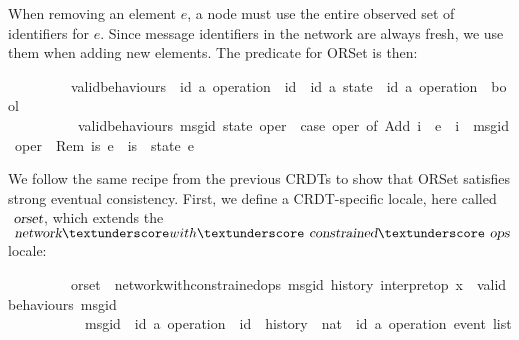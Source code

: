 When removing an element $e$, a node must use the entire observed set of identifiers for $e$.
Since message identifiers in the network are always fresh, we use them when adding new elements.
The  predicate for ORSet is then:

\vspace{0.35em}
\begin{isabellebody}
\ \ \ \ \ \ \ \ \ valid{\isacharunderscore}behaviours\ {\isacharcolon}{\isacharcolon}\ {\isachardoublequoteopen}{\isacharparenleft}{\isacharparenleft}{\isacharprime}id{\isacharcomma}\ {\isacharprime}a{\isacharparenright}\ operation\ {\isasymRightarrow}\ {\isacharprime}id{\isacharparenright}\ {\isasymRightarrow}\ {\isacharparenleft}{\isacharprime}id{\isacharcomma}\ {\isacharprime}a{\isacharparenright}\ state\ {\isasymRightarrow}\ {\isacharparenleft}{\isacharprime}id{\isacharcomma}\ {\isacharprime}a{\isacharparenright}\ operation\ {\isasymRightarrow}\ bool{\isachardoublequoteclose}\ \isanewline
\ \ \ \ \ \ \ \ \ \ {\isachardoublequoteopen}valid{\isacharunderscore}behaviours\ msg{\isacharunderscore}id\ state\ oper\ {\isasymequiv}\ case\ oper\ of\ Add\ i\ \ e\ {\isasymRightarrow}\ i\ {\isacharequal}\ msg{\isacharunderscore}id\ oper\ {\isacharbar}\ Rem\ is\ e\ {\isasymRightarrow}\ is\ {\isacharequal}\ state\ e{\isachardoublequoteclose}
\end{isabellebody}
\vspace{0.35em}
We follow the same recipe from the previous CRDTs to show that ORSet satisfies
strong eventual consistency. First, we define a CRDT-specific locale, here
called $\isa{orset}$, which extends the
$\isa{network}{\isacharunderscore}with{\isacharunderscore}\isa{constrained}{\isacharunderscore}\isa{ops}$
locale:
\vspace{0.35em}
\begin{isabellebody}
\ \ \ \ \ \ \ \ \ orset\ {\isacharequal}\ network{\isacharunderscore}with{\isacharunderscore}constrained{\isacharunderscore}ops\ msg{\isacharunderscore}id\ history\ interpret{\isacharunderscore}op\ {\isachardoublequoteopen}{\isasymlambda}x{\isachardot}\ {\isacharbraceleft}{\isacharbraceright}{\isachardoublequoteclose}\ {\isachardoublequoteopen}valid{\isacharunderscore}behaviours\ msg{\isacharunderscore}id{\isachardoublequoteclose}\isanewline
\ \ \ \ \ \ \ \ \ \ \ msg{\isacharunderscore}id\ {\isacharcolon}{\isacharcolon}\ {\isachardoublequoteopen}{\isacharparenleft}{\isacharprime}id{\isacharcomma}\ {\isacharprime}a{\isacharparenright}\ operation\ {\isasymRightarrow}\ {\isacharprime}id{\isachardoublequoteclose}\ \ history\ {\isacharcolon}{\isacharcolon}\ {\isachardoublequoteopen}nat\ {\isasymRightarrow}\ {\isacharparenleft}{\isacharprime}id{\isacharcomma}\ {\isacharprime}a{\isacharparenright}\ operation\ event\ list{\isachardoublequoteclose}
\end{isabellebody}
\vspace{0.35em}

